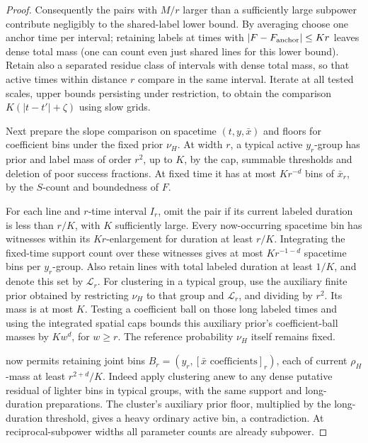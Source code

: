 \begin{proof}
Consequently the pairs with \(M/r\) larger than a sufficiently large subpower contribute negligibly to the shared-label lower bound. By averaging choose one anchor time per interval; retaining labels at times with \(|F-F_{\rm anchor}|\le K r\) leaves dense total mass (one can count even just shared lines for this lower bound). Retain also a separated residue class of intervals with dense total mass, so that active times within distance \(r\) compare in the same interval. Iterate at all tested scales, upper bounds persisting under restriction, to obtain the comparison \(K(|t-t'|+\zeta)\) using slow grids.

Next prepare the slope comparison on spacetime \((t,y,\bar x)\)
and floors for coefficient bins under the fixed prior \(\nu_H\).
At width \(r\), a typical active \(y_r\)-group has prior and
label mass of order \(r^2\), up to \(K\), by the cap, summable
thresholds and deletion of poor success fractions. At fixed time
it has at most \(Kr^{-d}\) bins of \(\bar x_r\), by the
\(S\)-count and boundedness of \(F\).

For each line and \(r\)-time interval \(I_r\), omit the pair
if its current labeled duration is less than \(r/K\), with
\(K\) sufficiently large. Every now-occurring spacetime bin
has witnesses within its \(Kr\)-enlargement for duration at
least \(r/K\). Integrating the fixed-time support count over
these witnesses gives at most \(Kr^{-1-d}\) spacetime bins per
\(y_r\)-group. Also retain lines with total labeled duration
at least \(1/K\), and denote this set by \(\mathcal L_r\).
For clustering in a typical group, use the auxiliary finite prior
obtained by restricting \(\nu_H\) to that group and
\(\mathcal L_r\), and dividing by \(r^2\). Its mass is at most
\(K\). Testing a coefficient ball on those long labeled times
and using the integrated spatial caps bounds this auxiliary
prior's coefficient-ball masses by \(Kw^d\), for \(w\ge r\).
The reference probability \(\nu_H\) itself remains fixed.

 now permits retaining joint bins
\(B_r=(y_r,[\bar x\text{ coefficients}]_r)\), each of current
\(\rho_H\)-mass at least \(r^{2+d}/K\). Indeed apply clustering
anew to any dense putative residual of lighter bins in typical
groups, with the same support and long-duration preparations. The
cluster's auxiliary prior floor, multiplied by the long-duration
threshold, gives a heavy ordinary active bin, a contradiction.
At reciprocal-subpower widths all parameter counts are already
subpower.


\end{proof}
